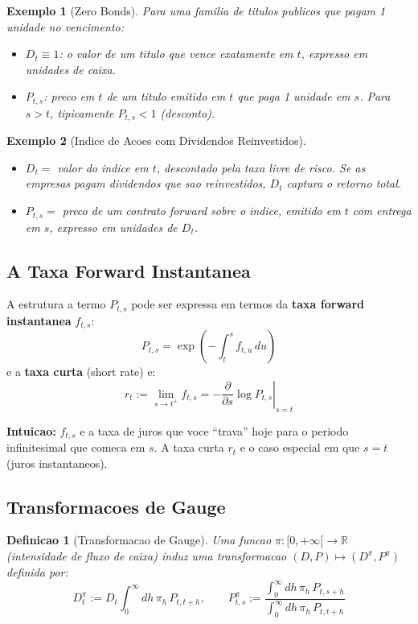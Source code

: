 \documentclass[12pt,a4paper]{article}
\newtheorem{defi}[teo]{Definicao}
\newtheorem{ex}{Exemplo}[section]
\theoremstyle{remark}
\begin{document}
\begin{ex}[Zero Bonds]
Para uma familia de titulos publicos que pagam 1 unidade no vencimento:
\begin{itemize}[nosep]
  \item $D_t \equiv 1$: o valor de um titulo que vence exatamente em $t$,
        expresso em unidades de caixa.
  \item $P_{t,s}$: preco em $t$ de um titulo emitido em $t$ que paga 1
        unidade em $s$. Para $s > t$, tipicamente $P_{t,s} < 1$ (desconto).
\end{itemize}
\end{ex}

\begin{ex}[Indice de Acoes com Dividendos Reinvestidos]
\begin{itemize}[nosep]
  \item $D_t =$ valor do indice em $t$, descontado pela taxa livre de risco.
        Se as empresas pagam dividendos que sao reinvestidos, $D_t$ captura o
        retorno total.
  \item $P_{t,s} =$ preco de um contrato forward sobre o indice, emitido em
        $t$ com entrega em $s$, expresso em unidades de $D_t$.
\end{itemize}
\end{ex}

\subsection{A Taxa Forward Instantanea}

A estrutura a termo $P_{t,s}$ pode ser expressa em termos da \textbf{taxa
forward instantanea} $f_{t,s}$:
\[
P_{t,s} = \exp\left(-\int_t^s f_{t,u}\, du\right)
\]
e a \textbf{taxa curta} (short rate) e:
\[
r_t := \lim_{s \to t^+} f_{t,s} = -\left.\frac{\partial}{\partial s}\log P_{t,s}\right|_{s=t}
\]

\textbf{Intuicao:} $f_{t,s}$ e a taxa de juros que voce ``trava'' hoje para o
periodo infinitesimal que comeca em $s$. A taxa curta $r_t$ e o caso especial
em que $s = t$ (juros instantaneos).

\subsection{Transformacoes de Gauge}

\begin{defi}[Transformacao de Gauge]
Uma funcao $\pi: [0,+\infty[ \to \mathbb{R}$ (intensidade de fluxo de caixa)
induz uma transformacao $(D,P) \mapsto (D^\pi, P^\pi)$ definida por:
\[
D_t^\pi := D_t \int_0^\infty dh\, \pi_h\, P_{t,t+h}, \qquad
P_{t,s}^\pi := \frac{\int_0^\infty dh\, \pi_h\, P_{t,s+h}}{\int_0^\infty dh\, \pi_h\, P_{t,t+h}}
\]
\end{defi}
\end{document}
